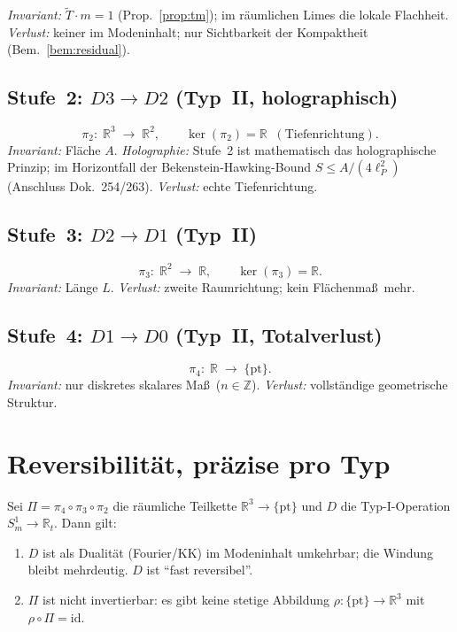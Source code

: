 \textit{Invariant:} $\tilde{T}\cdot m = 1$ (Prop.~\ref{prop:tm}); im r\"aumlichen
Limes die lokale Flachheit.\quad
\textit{Verlust:} keiner im Modeninhalt; nur Sichtbarkeit der Kompaktheit
(Bem.~\ref{bem:residual}).

\subsection{Stufe~2: $D3 \to D2$ (Typ~II, holographisch)}
\[
  \pi_2:\; \mathbb{R}^3 \;\longrightarrow\; \mathbb{R}^2,
  \qquad \ker(\pi_2) = \mathbb{R}\;\;(\text{Tiefenrichtung}).
\]
\textit{Invariant:} Fl\"ache $A$.\quad
\textit{Holographie:} Stufe~2 ist mathematisch das holographische Prinzip; im
Horizontfall der Bekenstein-Hawking-Bound $S \le A/(4\ell_P^2)$ (Anschluss
Dok.~254/263).\quad
\textit{Verlust:} echte Tiefenrichtung.

\subsection{Stufe~3: $D2 \to D1$ (Typ~II)}
\[
  \pi_3:\; \mathbb{R}^2 \;\longrightarrow\; \mathbb{R},
  \qquad \ker(\pi_3) = \mathbb{R}.
\]
\textit{Invariant:} L\"ange $L$.\quad
\textit{Verlust:} zweite Raumrichtung; kein Fl\"achenma\ss\ mehr.

\subsection{Stufe~4: $D1 \to D0$ (Typ~II, Totalverlust)}
\[
  \pi_4:\; \mathbb{R} \;\longrightarrow\; \{\mathrm{pt}\}.
\]
\textit{Invariant:} nur diskretes skalares Ma\ss\ ($n\in\mathbb{Z}$).\quad
\textit{Verlust:} vollst\"andige geometrische Struktur.

\section{Reversibilit\"at, pr\"azise pro Typ}

\begin{theorem}\label{satz:rev}
Sei $\Pi = \pi_4\circ\pi_3\circ\pi_2$ die r\"aumliche Teilkette
$\mathbb{R}^3 \to \{\mathrm{pt}\}$ und $D$ die Typ-I-Operation
$S^1_m \to \mathbb{R}_t$. Dann gilt:
\begin{enumerate}
  \item[(i)] $D$ ist als Dualit\"at (Fourier/KK) im Modeninhalt umkehrbar; die
  Windung bleibt mehrdeutig. $D$ ist ``fast reversibel''.
  \item[(ii)] $\Pi$ ist nicht invertierbar: es gibt keine stetige Abbildung
  $\rho:\{\mathrm{pt}\}\to\mathbb{R}^3$ mit $\rho\circ\Pi=\mathrm{id}$.
\end{enumerate}
\end{theorem}

